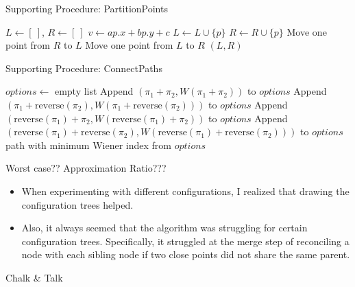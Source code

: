 \documentclass[11pt]{beamer}
\begin{document}
\begin{frame}{Supporting Procedure: PartitionPoints}
	\begin{algorithm}[H]
		\caption{PartitionPoints($P$, $a$, $b$, $c$)}
		\begin{algorithmic}[1]
			\State $L \gets [\ ]$, $R \gets [\ ]$
			\State $v \gets ap.x + bp.y + c$
			\State $L \gets L \cup \{p\}$
			\Else
			\State $R \gets R \cup \{p\}$
			\EndIf
			\EndFor
			\State Move one point from $R$ to $L$
			\State Move one point from $L$ to $R$
			\EndIf
			\State \Return $(L, R)$
			\EndProcedure
		\end{algorithmic}
	\end{algorithm}
\end{frame}

\begin{frame}{Supporting Procedure: ConnectPaths}
	\begin{algorithm}[H]
		\caption{ConnectPaths($\pi_1$, $\pi_2$)}
		\begin{algorithmic}[1]
			\State $options \gets$ empty list
			\State Append $(\pi_1 + \pi_2, W(\pi_1 + \pi_2))$ to $options$
			\State Append $(\pi_1 + \text{reverse}(\pi_2), W(\pi_1 + \text{reverse}(\pi_2)))$ to $options$
			\State Append $(\text{reverse}(\pi_1) + \pi_2, W(\text{reverse}(\pi_1) + \pi_2))$ to $options$
			\State Append $(\text{reverse}(\pi_1) + \text{reverse}(\pi_2), W(\text{reverse}(\pi_1) + \text{reverse}(\pi_2)))$ to $options$
			\State \Return path with minimum Wiener index from $options$
			\EndProcedure
		\end{algorithmic}
	\end{algorithm}
\end{frame}


\begin{frame}{Worst case?? Approximation Ratio???}
	\begin{itemize}
		\item When experimenting with different configurations, I realized that drawing the configuration trees helped.
		      \pause
		\item Also, it always seemed that the algorithm was struggling for certain configuration trees. Specifically, it struggled at the merge step of reconciling a node with each sibling node if two close points did not share the same parent.
	\end{itemize}

	\vspace{0.5cm}

	\pause
	\begin{center}
		Chalk \& Talk
	\end{center}
\end{frame}
\end{document}
